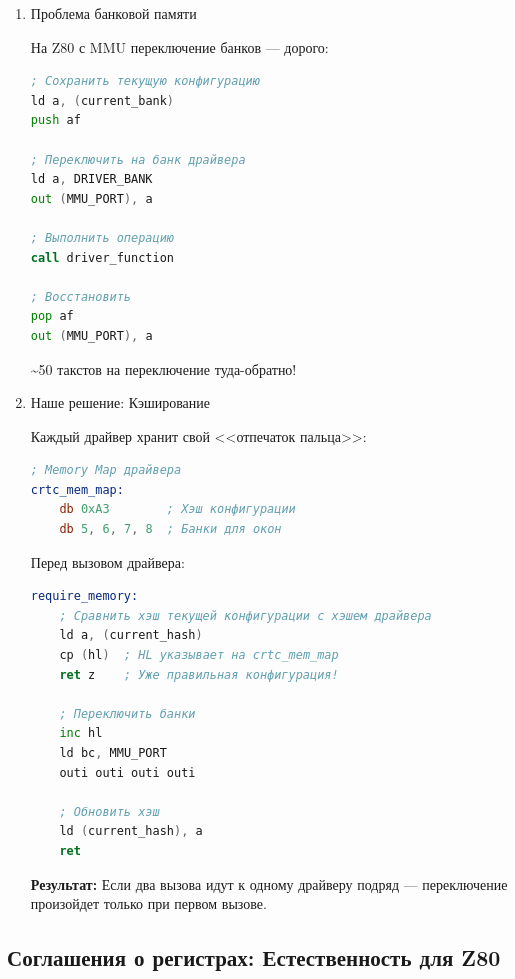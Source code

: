 \documentclass[11pt,a4paper]{scrartcl}
\begin{document}
\begin{enumerate}
\item Проблема банковой памяти
\label{sec:orga1951b5}

На Z80 с MMU переключение банков — дорого:

\begin{lstlisting}[language=asm,numbers=none]
; Сохранить текущую конфигурацию
ld a, (current_bank)
push af

; Переключить на банк драйвера
ld a, DRIVER_BANK
out (MMU_PORT), a

; Выполнить операцию
call driver_function

; Восстановить
pop af
out (MMU_PORT), a
\end{lstlisting}

\textasciitilde{}50 такстов на переключение туда-обратно!
\item Наше решение: Кэширование
\label{sec:org2a45bac}

Каждый драйвер хранит свой {}<<отпечаток пальца>>{}:

\begin{lstlisting}[language=asm,numbers=none]
; Memory Map драйвера
crtc_mem_map:
    db 0xA3        ; Хэш конфигурации
    db 5, 6, 7, 8  ; Банки для окон
\end{lstlisting}

Перед вызовом драйвера:

\begin{lstlisting}[language=asm,numbers=none]
require_memory:
    ; Сравнить хэш текущей конфигурации с хэшем драйвера
    ld a, (current_hash)
    cp (hl)  ; HL указывает на crtc_mem_map
    ret z    ; Уже правильная конфигурация!
    
    ; Переключить банки
    inc hl
    ld bc, MMU_PORT
    outi outi outi outi
    
    ; Обновить хэш
    ld (current_hash), a
    ret
\end{lstlisting}

\textbf{Результат:} Если два вызова идут к одному драйверу подряд — переключение произойдет только при первом вызове.
\end{enumerate}
\subsection{Соглашения о регистрах: Естественность для Z80}
\label{sec:org6e3ccc3}
\end{document}
